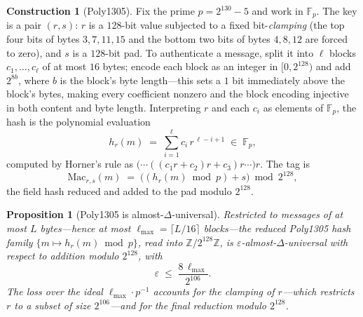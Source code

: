\documentclass[11pt,a4paper]{article}
\newtheorem{proposition}[theorem]{Proposition}
\theoremstyle{definition}
\newtheorem{construction}[theorem]{Construction}
\theoremstyle{remark}
\newcommand{\Z}{\ensuremath{\mathbb{Z}}}
\newcommand{\F}{\ensuremath{\mathbb{F}}}
\providecommand{\ceil}[1]{\lceil #1 \rceil}
\begin{document}
\begin{construction}[Poly1305]\label{symmetric:def-poly1305}
Fix the prime \(p = 2^{130} - 5\) and work in \(\F_{p}\). The key is
a pair \((r, s)\): \(r\) is a \(128\)-bit value subjected to a fixed
bit-\emph{clamping} (the top four bits of bytes \(3, 7, 11, 15\) and
the bottom two bits of bytes \(4, 8, 12\) are forced to zero), and
\(s\) is a \(128\)-bit pad. To authenticate a message, split it into
\(\ell\) blocks \(c_{1}, \dots, c_{\ell}\) of at most \(16\) bytes;
encode each block as an integer in \([0, 2^{128})\) and add
\(2^{8b}\), where \(b\) is the block's byte length---this sets a
\(1\) bit immediately above the block's bytes, making every coefficient
nonzero and the block encoding injective in both content and byte
length. Interpreting
\(r\) and each \(c_{i}\) as elements of \(\F_{p}\), the hash is the
polynomial evaluation
\[
h_{r}(m) \;=\; \sum_{i=1}^{\ell} c_{i}\, r^{\,\ell - i + 1}
\;\in\; \F_{p},
\]
computed by Horner's rule as
\(\bigl(\cdots((c_{1} r + c_{2}) r + c_{3}) r \cdots\bigr) r\). The
tag is
\[
\mathrm{Mac}_{r,s}(m)
\;=\; \bigl( (h_{r}(m) \bmod p) + s \bigr) \bmod 2^{128},
\]
the field hash reduced and added to the pad modulo \(2^{128}\).
\end{construction}

\begin{proposition}[Poly1305 is almost-\(\Delta\)-universal]
\label{symmetric:prop-poly1305-axu}
Restricted to messages of at most \(L\) bytes---hence at most
\(\ell_{\max} = \ceil{L/16}\) blocks---the reduced \textsf{Poly1305}
hash family \(\{m \mapsto h_{r}(m) \bmod p\}\), read into
\(\Z/2^{128}\Z\), is \(\varepsilon\)-almost-\(\Delta\)-universal with
respect to addition modulo \(2^{128}\), with
\[
\varepsilon \;\le\; \frac{8\, \ell_{\max}}{2^{106}}.
\]
The loss over the ideal \(\ell_{\max} \cdot p^{-1}\) accounts for the
clamping of \(r\)---which restricts \(r\) to a subset of size
\(2^{106}\)---and for the final reduction modulo \(2^{128}\).
\end{proposition}
\end{document}
